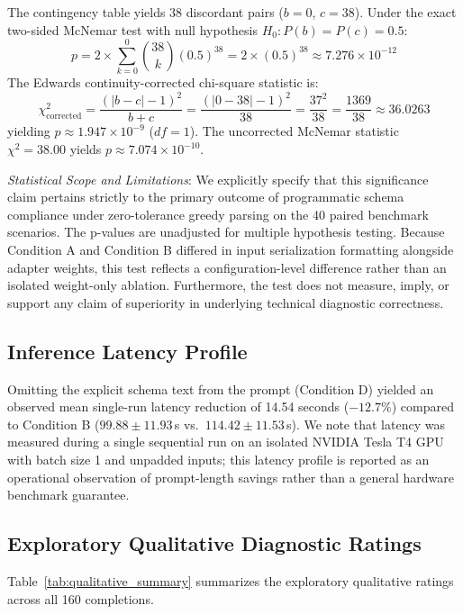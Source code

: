\documentclass[11pt,a4paper]{article}
\begin{document}
The contingency table yields 38 discordant pairs ($b=0$, $c=38$). Under the exact two-sided McNemar test with null hypothesis $H_0: P(b) = P(c) = 0.5$:
\begin{equation}
p = 2 \times \sum_{k=0}^{0} \binom{38}{k} (0.5)^{38} = 2 \times (0.5)^{38} \approx 7.276 \times 10^{-12}
\end{equation}
The Edwards continuity-corrected chi-square statistic is:
\begin{equation}
\chi^{2}_{\text{corrected}} = \frac{(|b - c| - 1)^2}{b + c} = \frac{(|0 - 38| - 1)^2}{38} = \frac{37^2}{38} = \frac{1369}{38} \approx 36.0263
\end{equation}
yielding $p \approx 1.947 \times 10^{-9}$ ($df=1$). The uncorrected McNemar statistic $\chi^2 = 38.00$ yields $p \approx 7.074 \times 10^{-10}$.

\textit{Statistical Scope and Limitations}: We explicitly specify that this significance claim pertains strictly to the primary outcome of programmatic schema compliance under zero-tolerance greedy parsing on the 40 paired benchmark scenarios. The p-values are unadjusted for multiple hypothesis testing. Because Condition A and Condition B differed in input serialization formatting alongside adapter weights, this test reflects a configuration-level difference rather than an isolated weight-only ablation. Furthermore, the test does not measure, imply, or support any claim of superiority in underlying technical diagnostic correctness.

\subsection{Inference Latency Profile}
Omitting the explicit schema text from the prompt (Condition D) yielded an observed mean single-run latency reduction of 14.54 seconds ($-12.7\%$) compared to Condition B ($99.88 \pm 11.93$\,s vs.\ $114.42 \pm 11.53$\,s). We note that latency was measured during a single sequential run on an isolated NVIDIA Tesla T4 GPU with batch size 1 and unpadded inputs; this latency profile is reported as an operational observation of prompt-length savings rather than a general hardware benchmark guarantee.

\subsection{Exploratory Qualitative Diagnostic Ratings}

Table~\ref{tab:qualitative_summary} summarizes the exploratory qualitative ratings across all 160 completions.
\end{document}
